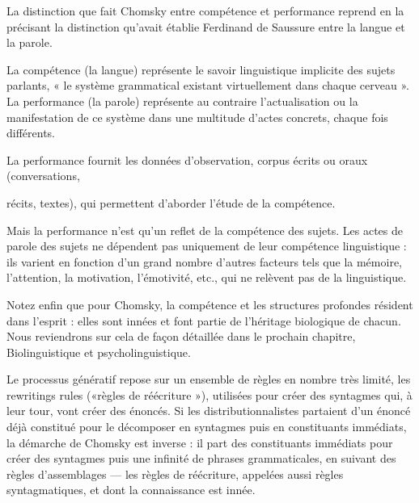 
La distinction que fait Chomsky entre compétence et performance reprend en la précisant la distinction qu’avait établie Ferdinand de Saussure entre la langue et la parole.\par

La compétence (la langue) représente le savoir linguistique implicite des sujets parlants, « le système grammatical existant virtuellement dans chaque cerveau ». La performance (la parole) représente au contraire l’actualisation ou la manifestation de ce système dans une multitude d’actes concrets, chaque fois différents.\par

La performance fournit les données d’observation, corpus écrits ou oraux (conversations,\par

récits, textes), qui permettent d’aborder l’étude de la compétence.\par

Mais la performance n’est qu’un reflet de la compétence des sujets. Les actes de parole des sujets ne dépendent pas uniquement de leur compétence linguistique : ils varient en fonction d’un grand nombre d’autres facteurs tels que la mémoire, l’attention, la motivation, l’émotivité, etc., qui ne relèvent pas de la linguistique.\par

Notez enfin que pour Chomsky, la compétence et les structures profondes résident dans l’esprit : elles sont innées et font partie de l’héritage biologique de chacun. Nous reviendrons sur cela de façon détaillée dans le prochain chapitre, Biolinguistique et psycholinguistique.\par


Le processus génératif repose sur un ensemble de règles en nombre très limité, les rewritings rules («règles de réécriture »), utilisées pour créer des syntagmes qui, à leur tour, vont créer des énoncés. Si les distributionnalistes partaient d’un énoncé déjà constitué pour le décomposer en syntagmes puis en constituants immédiats, la démarche de Chomsky est inverse : il part des constituants immédiats pour créer des syntagmes puis une infinité de phrases grammaticales, en suivant des règles d’assemblages — les règles de réécriture, appelées aussi règles syntagmatiques, et dont la connaissance est innée.\par

